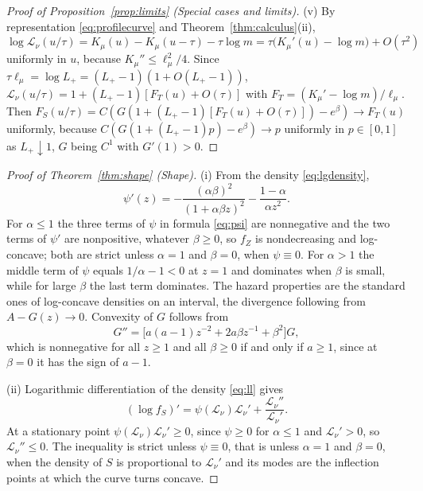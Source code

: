 \documentclass[sn-mathphys-num]{sn-jnl}\newcommand{\SNJNL}{}
\theoremstyle{thmstyleone}
\theoremstyle{thmstyletwo}
\theoremstyle{thmstylethree}
\theoremstyle{thmstyleone}
\providecommand{\Leh}{\mathscr{L}}
\begin{document}
\begin{appendices}
\begin{proof}[Proof of Proposition~\ref{prop:limits} (Special cases and limits)]
			\noindent(v) By
			representation \eqref{eq:profilecurve} and Theorem~\ref{thm:calculus}(ii),
			\begin{equation}\label{eq:smallrange}
				\log\Leh_\nu(u/\tau)=K_\mu(u)-K_\mu(u-\tau)-\tau\log m
				=\tau\bigl(K_\mu'(u)-\log m\bigr)+O(\tau^{2})
			\end{equation}
			uniformly in $u$, because $K_\mu''\le\ell_\mu^{2}/4$. Since
			$\tau\ell_\mu=\log L_+=(L_+-1)(1+O(L_+-1))$,
			$\Leh_\nu(u/\tau)=1+(L_+-1)[F_T(u)+O(\tau)]$ with
			$F_T=(K_\mu'-\log m)/\ell_\mu$. Then
			$F_S(u/\tau)=C(G(1+(L_+-1)[F_T(u)+O(\tau)])-e^{\beta})\to F_T(u)$
			uniformly, because $C(G(1+(L_+-1)p)-e^{\beta})\to p$ uniformly in
			$p\in[0,1]$ as $L_+\downarrow1$, $G$ being $C^{1}$ with $G'(1)>0$.
		\end{proof}
		
		\begin{proof}[Proof of Theorem~\ref{thm:shape} (Shape)]\leavevmode
			
			\noindent(i) From the density \eqref{eq:lgdensity},
			\begin{equation}\label{eq:psiprime}
				\psi'(z)=-\frac{(\alpha\beta)^{2}}{(1+\alpha\beta z)^{2}}-\frac{1-\alpha}{\alpha z^{2}} .
			\end{equation}
			For $\alpha\le1$ the three terms of $\psi$ in formula \eqref{eq:psi}
			are nonnegative and the two terms of $\psi'$ are nonpositive,
			whatever $\beta\ge0$, so $f_Z$ is nondecreasing and log-concave;
			both are strict unless $\alpha=1$ and $\beta=0$, when $\psi\equiv0$.
			For $\alpha>1$ the middle term of $\psi$ equals $1/\alpha-1<0$ at
			$z=1$ and dominates when $\beta$ is small, while for large $\beta$
			the last term dominates. The hazard properties
			are the standard ones of log-concave densities on an interval, the
			divergence following from $A-G(z)\to0$. Convexity of $G$ follows
			from
			\begin{equation}\label{eq:Gsecond}
				G''=\bigl[a(a-1)z^{-2}+2a\beta z^{-1}+\beta^{2}\bigr]G,
			\end{equation}
			which is nonnegative for all $z\ge1$ and all $\beta\ge0$ if and only
			if $a\ge1$, since at $\beta=0$ it has the sign of $a-1$.
			
			\noindent(ii)
			Logarithmic differentiation of the density \eqref{eq:ll} gives
			\begin{equation}\label{eq:logfS}
				(\log f_S)'=\psi(\Leh_\nu)\Leh_\nu'+\frac{\Leh_\nu''}{\Leh_\nu'} .
			\end{equation}
			At a stationary point $\psi(\Leh_\nu)\Leh_\nu'\ge0$, since
			$\psi\ge0$ for $\alpha\le1$ and $\Leh_\nu'>0$, so $\Leh_\nu''\le0$.
			The inequality is strict unless $\psi\equiv0$, that is unless
			$\alpha=1$ and $\beta=0$, when the density of $S$ is proportional
			to $\Leh_\nu'$ and its modes are the inflection points at which
			the curve turns concave.
			

\end{proof}
\end{appendices}
\end{document}
